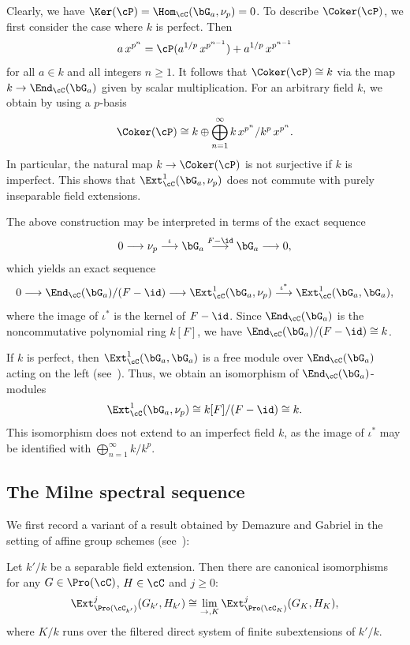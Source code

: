 \begin{rema}
Clearly, we have $\Ker(\cP) = \Hom_{\cC}(\bG_a,\nu_p) = 0$. To describe $\Coker(\cP)$, we first consider the case where $k$ is perfect. Then
\[
a \, x^{p^n} = \cP(a^{1/p} \, x^{p^{n-1}}) + a^{1/p} \, x^{p^{n-1}}
\]
for all $a \in k$ and all integers $n \geq 1$. It follows that $\Coker(\cP) \cong k$ via the map $k \to \End_{\cC}(\bG_a)$ given by scalar multiplication. For an arbitrary field $k$, we obtain by using a $p$-basis
\[
\Coker(\cP) \cong k \oplus
\bigoplus_{n=1}^{\infty} k \, x^{p^n}/k^p \, x^{p^n}.
\]
In particular, the natural map $k \to \Coker(\cP)$ is not surjective if $k$ is imperfect. This shows that $\Ext^1_{\cC}(\bG_a,\nu_p)$ does not commute with purely inseparable field extensions.

The above construction may be interpreted in terms of the exact sequence
\[
0 \longrightarrow \nu_p
\stackrel{\iota}{\longrightarrow} \bG_a
\stackrel{F - \id}{\longrightarrow} \bG_a
\longrightarrow 0,
\]
which yields an exact sequence
\[
0 \longrightarrow \End_{\cC}(\bG_a)/(F - \id)
\longrightarrow \Ext^1_{\cC}(\bG_a,\nu_p)
\stackrel{\iota^*}{\longrightarrow}
\Ext^1_{\cC}(\bG_a, \bG_a),
\]
where the image of $\iota^*$ is the kernel of $F - \id$. Since $ \End_{\cC}(\bG_a)$ is the noncommutative polynomial ring $k[F]$, we have $\End_{\cC}(\bG_a)/(F - \id) \cong k$.

If $k$ is perfect, then $\Ext^1_{\cC}(\bG_a, \bG_a)$ is a free module over $\End_{\cC}(\bG_a)$ acting on the left (see~\cite[V.1.5.2]{DG}). Thus, we obtain an isomorphism of $\End_{\cC}(\bG_a)$-modules
\[
\Ext^1_{\cC}(\bG_a,\nu_p)
\cong k[F]/(F - \id) \cong k.
\]
This isomorphism does not extend to an imperfect field $k$, as the image of $\iota^*$ may be identified with $\bigoplus_{n = 1}^{\infty} k/k^p$.
\end{rema}

\subsection{The Milne spectral sequence}\label{subsec:milne}

We first record a variant of a result obtained by Demazure and Gabriel in the setting of affine group schemes (see~\cite[V.3.2.3]{DG}):

\begin{lemm}\label{lem:finite}
Let $k'/k$ be a separable field extension. Then there are canonical isomorphisms for any $G \in \Pro(\cC)$, $H \in \cC$ and $j \geq 0$:
\[
\Ext^j_{\Pro(\cC_{k'})}(G_{k'},H_{k'}) \cong
\lim_{\to, K} \Ext^j_{\Pro(\cC_K)}(G_K,H_K),
\]
where $K/k$ runs over the filtered direct system of finite subextensions of $k'/k$.
\end{lemm}

